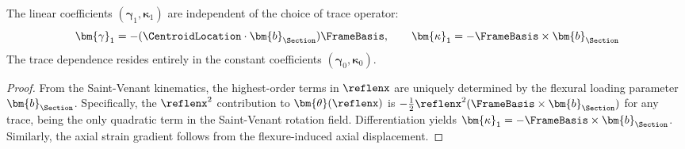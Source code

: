 \begin{proposition}
\label{prop:universal-gradients}
The linear coefficients $(\bm{\gamma}_1, \bm{\kappa}_1)$ are independent of the 
choice of trace operator:
\begin{equation}
\bm{\gamma}_1 = -(\CentroidLocation \cdot \bm{b}_\Section) \FrameBasis, 
\qquad 
\bm{\kappa}_1 = -\FrameBasis \times \bm{b}_\Section
\label{eq:universal-gradients}
\end{equation}
The trace dependence resides entirely in the constant coefficients 
$(\bm{\gamma}_0, \bm{\kappa}_0)$.
\end{proposition}

\begin{proof}
From the Saint-Venant kinematics, the highest-order terms in $\reflenx$ are 
uniquely determined by the flexural loading parameter $\bm{b}_\Section$. 
Specifically, the $\reflenx^2$ contribution to $\bm{\theta}(\reflenx)$ is 
$-\tfrac{1}{2}\reflenx^2 (\FrameBasis \times \bm{b}_\Section)$ for any trace, 
being the only quadratic term in the Saint-Venant rotation field. 
Differentiation yields $\bm{\kappa}_1 = -\FrameBasis \times \bm{b}_\Section$. 
Similarly, the axial strain gradient follows from the flexure-induced 
axial displacement.
\end{proof}

